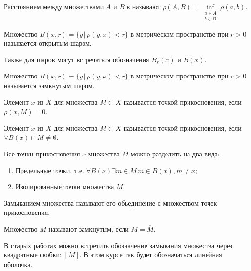 \begin{Def}
    Расстоянием между множествами $A$ и $B$ в \MS называют $\rho(A, B) = \inf\limits_{\substack{a \in A\\ b \in B}} \rho(a, b)$.
\end{Def}

\begin{Def}
    Множество $B(x, r) = \{ y \, | \, \rho(y, x) < r \}$ в метрическом пространстве при $r > 0$ называется открытым шаром.
\end{Def}
    Также для шаров могут встречаться обозначения $B_r(x)$ и $B(x)$.

\begin{Def}
    Множество $\overline{B}(x, r) = \{ y \, | \, \rho(y, x) < r \}$ в метрическом пространстве при $r > 0$ называется замкнутым шаром.
\end{Def}

\begin{Def}
    Элемент $x$ из \MS $X$ для множества $M \subset X$ называется точкой прикосновения, если $\rho(x, M) = 0$.
\end{Def}

\begin{Def}
    Элемент $x$ из \TS $X$ для множества $M \subset X$ называется точкой прикосновения, если $\forall B(x) \cap M \neq \emptyset$.
\end{Def}

\vspace{0.5cm}

Все точки прикосновения $x$ множества $M$ можно разделить на два вида:
\begin{enumerate}
    \item Предельные точки, т.е. $\forall B(x) \exists m \in M \, m \in B(x), m \neq x$;
    \item Изолированные точки множества $M$.
\end{enumerate}

\begin{Def}
    Замыканием множества называют его объединение с множеством точек прикосновения.
\end{Def}

\begin{Def}
    Множество $M$ называют замкнутым, если $M = \overline{M}$.
\end{Def}

В старых работах можно встретить обозначение замыкания множества через квадратные скобки: $[M]$. В этом курсе так будет обозначаться линейная оболочка.

